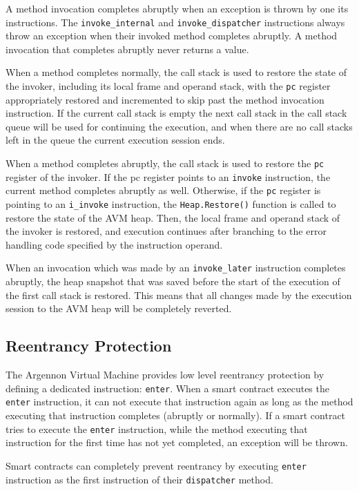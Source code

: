 A method invocation completes abruptly when an exception is thrown by one its instructions.
The \texttt{invoke\_internal} and \texttt{invoke\_dispatcher} instructions
always throw an exception when their invoked method completes abruptly. A
method invocation that completes abruptly never returns a value.

When a method completes normally, the call stack is used to restore the state of the invoker,
including its local frame and operand stack, with the \texttt{pc} register appropriately restored and incremented
to skip past the method invocation instruction. If the current call stack is empty the next call stack in the call
stack queue will be used for continuing the execution, and when there are no call stacks left in the queue the
current execution session ends.

When a method completes abruptly, the call stack is used to restore the \texttt{pc} register of the invoker. If the pc
register points to an \texttt{invoke} instruction, the current method completes abruptly as well. Otherwise, if
the \texttt{pc} register is pointing to an \texttt{i\_invoke} instruction, the \texttt{Heap.Restore()} function is
called to restore the state of the AVM heap. Then, the
local frame and operand stack of the invoker is restored, and execution continues after branching to the error handling
code specified by the instruction operand.

When an invocation which was made by an \texttt{invoke\_later} instruction completes abruptly, the
heap snapshot that was saved before the start of the
execution of the first call stack is restored. This means
that all changes made by the execution session to the AVM heap will be completely reverted.

\subsection{Reentrancy Protection}\label{subsec:reentrancy}

The Argennon Virtual Machine provides low level reentrancy protection by defining a dedicated
instruction: \texttt{enter}. When a smart contract executes the \texttt{enter} instruction, it
can not execute that instruction again as long
as the method executing that instruction completes (abruptly or normally). If a smart contract tries to execute
the \texttt{enter} instruction, while the method executing that instruction for the first time has not yet completed,
an exception will be thrown.

Smart contracts can completely prevent reentrancy by executing \texttt{enter} instruction as the first instruction
of their \texttt{dispatcher} method.

